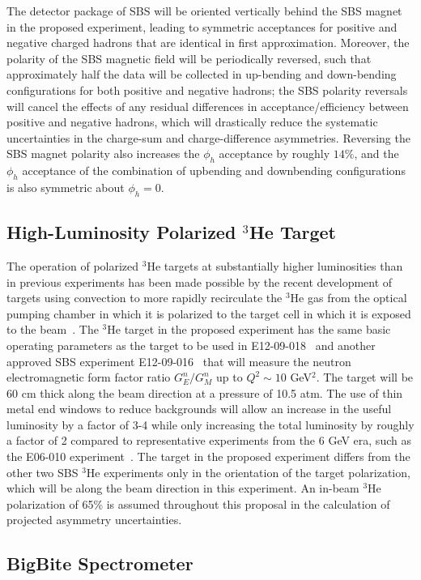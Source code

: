 The detector package of SBS will be oriented vertically behind the SBS magnet in the proposed experiment, leading to symmetric acceptances for positive and negative charged hadrons that are identical in first approximation. Moreover, the polarity of the SBS magnetic field will be periodically reversed, such that approximately half the data will be collected in up-bending and down-bending configurations for both positive and negative hadrons; the SBS polarity reversals will cancel the effects of any residual differences in acceptance/efficiency between positive and negative hadrons, which will drastically reduce the systematic uncertainties in the charge-sum and charge-difference asymmetries. Reversing the SBS magnet polarity also increases the $\phi_h$ acceptance by roughly $14\%$, and the $\phi_h$ acceptance of the combination of upbending and downbending configurations is also symmetric about $\phi_h = 0$. 
\subsection{High-Luminosity Polarized $^3$He Target}

The operation of polarized $^3$He targets at substantially higher luminosities than in previous experiments has been made possible by the recent development of targets using convection to more rapidly recirculate the $^3$He gas from the optical pumping chamber in which it is polarized to the target cell in which it is exposed to the beam~\cite{Helium3_target}. The $^3$He target in the proposed experiment has the same basic operating parameters as the target to be used in E12-09-018~\cite{SBS_SIDIS} and another approved SBS experiment E12-09-016~\cite{GEN2} that will measure the neutron electromagnetic form factor ratio $G_E^n/G_M^n$ up to $Q^2 \sim 10$ GeV$^2$. The target will be 60 cm thick along the beam direction at a pressure of 10.5 atm. The use of thin metal end windows to reduce backgrounds will allow an increase in the useful luminosity by a factor of 3-4 while only increasing the total luminosity by roughly a factor of 2 compared to representative experiments from the 6 GeV era, such as the E06-010 experiment~\cite{E06010_AUT_PRL}. The target in the proposed experiment differs from the other two SBS $^3$He experiments only in the orientation of the target polarization, which will be along the beam direction in this experiment. An in-beam $^3$He  polarization of 65\% is assumed throughout this proposal in the calculation of projected asymmetry uncertainties. 
\subsection{BigBite Spectrometer}


